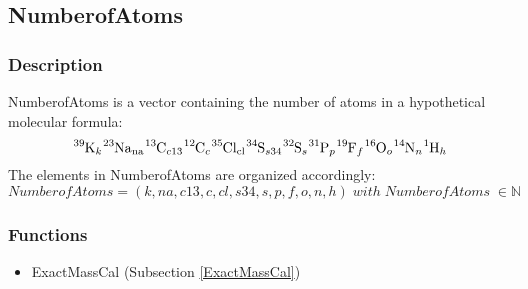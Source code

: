 \subsection{NumberofAtoms}\label{NumberofAtoms}
\subsubsection{Description}

NumberofAtoms is a vector containing the number of atoms in a hypothetical molecular formula:
\begin{equation}
\ce{^{39}K_{k}} \ce{^{23}Na_{na}} \ce{^{13}C_{c13}} \ce{^{12}C_{c}} \ce{^{35}Cl_{cl}} \ce{^{34}S_{s34}} \ce{^{32}S_{s}} \ce{^{31}P_{p}} \ce{^{19}F_{f}} \ce{^{16}O_{o}} \ce{^{14}N_{n}} \ce{^{1}H_{h}}
\end{equation} 
The elements in NumberofAtoms are organized accordingly: 
\begin{equation}
NumberofAtoms=(k,na,c13,c,cl,s34,s,p,f,o,n,h) \; with \; NumberofAtoms \;\in \mathbb{N}
\end{equation}
\subsubsection{Functions}
\begin{itemize}
\item ExactMassCal (Subsection \ref{ExactMassCal})
\end{itemize}

